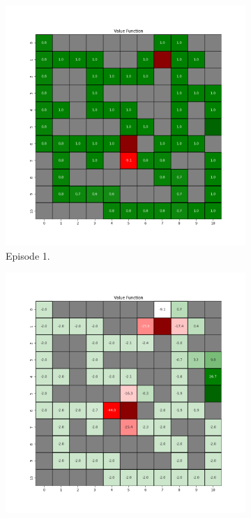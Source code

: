 \documentclass{assignment}
\begin{document}
\begin{figure}[H]
    \begin{subfigure}{0.3\textwidth}
        \includegraphics[width=\textwidth]{figures/value_td/gamma_sweep/value_function_alpha_0.1_gamma_0.5_epsilon_0.2_iteration_1.png}
    \caption{Episode 1.}
    \end{subfigure}\hfill
    \begin{subfigure}{0.3\textwidth}
        \includegraphics[width=\textwidth]{figures/value_td/gamma_sweep/value_function_alpha_0.1_gamma_0.5_epsilon_0.2_iteration_50.png}

\end{subfigure}
\end{figure}
\end{document}
